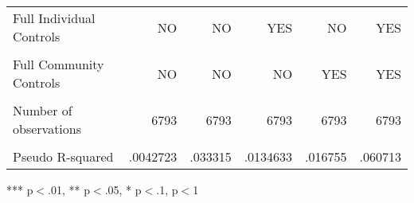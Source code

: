 \begin{table}[!h]
\begin{tabular}{llllll}
\multicolumn{1}{l}{Full Individual Controls} &
  \multicolumn{1}{r}{NO} &
  \multicolumn{1}{r}{NO} &
  \multicolumn{1}{r}{YES} &
  \multicolumn{1}{r}{NO} &
  \multicolumn{1}{r}{YES} \\
\multicolumn{1}{l}{} &
  \multicolumn{1}{r}{} &
  \multicolumn{1}{r}{} &
  \multicolumn{1}{r}{} &
  \multicolumn{1}{r}{} &
  \multicolumn{1}{r}{} \\
\multicolumn{1}{l}{Full Community Controls} &
  \multicolumn{1}{r}{NO} &
  \multicolumn{1}{r}{NO} &
  \multicolumn{1}{r}{NO} &
  \multicolumn{1}{r}{YES} &
  \multicolumn{1}{r}{YES} \\
\multicolumn{1}{l}{} &
  \multicolumn{1}{r}{} &
  \multicolumn{1}{r}{} &
  \multicolumn{1}{r}{} &
  \multicolumn{1}{r}{} &
  \multicolumn{1}{r}{} \\
\multicolumn{1}{l}{Number of observations} &
  \multicolumn{1}{r}{6793} &
  \multicolumn{1}{r}{6793} &
  \multicolumn{1}{r}{6793} &
  \multicolumn{1}{r}{6793} &
  \multicolumn{1}{r}{6793} \\
\multicolumn{1}{l}{} &
  \multicolumn{1}{r}{} &
  \multicolumn{1}{r}{} &
  \multicolumn{1}{r}{} &
  \multicolumn{1}{r}{} &
  \multicolumn{1}{r}{} \\
\multicolumn{1}{l}{Pseudo R-squared} &
  \multicolumn{1}{r}{.0042723} &
  \multicolumn{1}{r}{.033315} &
  \multicolumn{1}{r}{.0134633} &
  \multicolumn{1}{r}{.016755} &
  \multicolumn{1}{r}{.060713} \\
\cline{1-6}
\end{tabular}

\footnotesize{
*** p$<$.01, ** p$<$.05, * p$<$.1,  p$<$1
}
\end{table}
